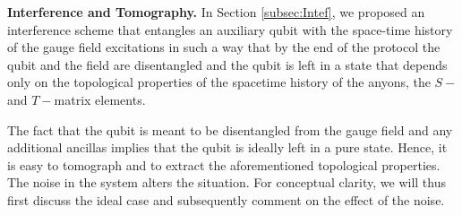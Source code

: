 \documentclass[two column]{article}
\begin{document}
%









\textbf{Interference and Tomography.}
In Section \ref{subsec:Intef}, we proposed an interference scheme that entangles an auxiliary qubit with the space-time history of the gauge field excitations in such a way that by the end of the protocol the qubit and the field are disentangled and the qubit is left in a state that depends only on the topological properties of the spacetime history of the anyons, the $S-$ and $T-$matrix elements.

The fact that the qubit is meant to be disentangled from the gauge field and any additional ancillas implies that the qubit is ideally left in a pure state. Hence, it is easy to tomograph and to extract the aforementioned topological properties. The noise in the system alters the situation. For conceptual clarity, we will thus first discuss the ideal case and subsequently comment on the effect of the noise.
\end{document}
